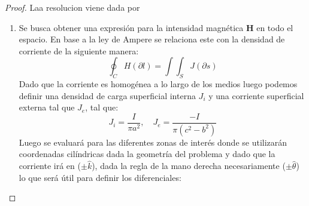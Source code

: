 \begin{problema}
\begin{center}
\end{center}
\end{problema}
\begin{proof} %
    Laa resolucion viene dada por
    \begin{enumerate}
        \item Se busca obtener una expresión para la intensidad magnética \textbf{H} en todo el espacio. En base a la ley de Ampere se relaciona este con la densidad de corriente de la siguiente manera:
        \begin{equation}
            \oint_{C} H (\partial l) = \int\int_{S} J (\partial s) 
        \end{equation}
        Dado que la corriente es homogénea a lo largo de los medios luego podemos definir una densidad de carga superficial interna $J_{i}$ y una corriente superficial externa tal que $J_{e}$, tal que:
        \begin{equation}
            J_{i} = \frac{I}{\pi a^{2}}, \quad J_{e} = \frac{-I}{\pi (c^{2}-b^{2})}
        \end{equation}
        Luego se evaluará para las diferentes zonas de interés donde se utilizarán coordenadas cilíndricas dada la geometría del problema y dado que la corriente irá en ($\pm\hat{k}$), dada la regla de la mano derecha necesariamente ($\pm\hat{\theta}$) lo que será útil para definir los diferenciales:
        

\end{enumerate}
\end{proof}
